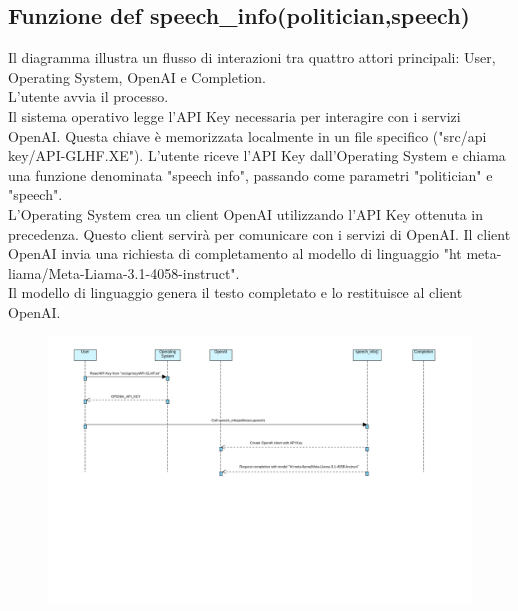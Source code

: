 \documentclass{article}
\begin{document}
	\subsection{Funzione def speech\_info(politician,speech)}
Il diagramma illustra un flusso di interazioni tra quattro attori principali: User, Operating System, OpenAI e Completion.\\
L'utente avvia il processo.\\
Il sistema operativo legge l'API Key necessaria per interagire con i servizi OpenAI. Questa chiave è memorizzata localmente in un file specifico ("src/api key/API-GLHF.XE").
L'utente riceve l'API Key dall'Operating System e chiama una funzione denominata "speech info", passando come parametri "politician" e "speech".\\
L'Operating System crea un client OpenAI utilizzando l'API Key ottenuta in precedenza. Questo client servirà per comunicare con i servizi di OpenAI.
Il client OpenAI invia una richiesta di completamento al modello di linguaggio "ht meta-liama/Meta-Liama-3.1-4058-instruct".\\
Il modello di linguaggio genera il testo completato e lo restituisce al client OpenAI.	
	\begin{figure}[h]
		\centering
		\includegraphics[width=1.1\textwidth]{immagini/speechscraping}
	\end{figure}
	
\end{document}
